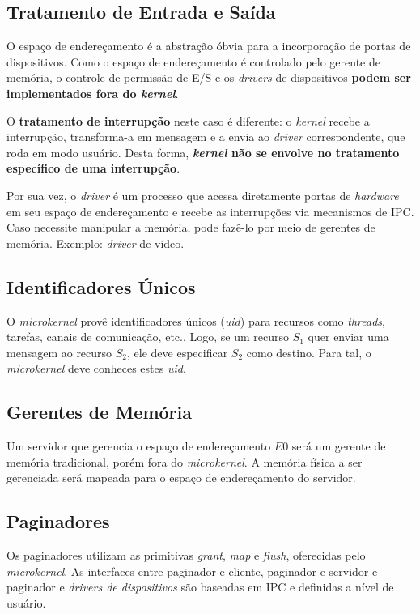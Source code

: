 \subsection{Tratamento de Entrada e Saída}
O espaço de endereçamento é a abstração óbvia para a incorporação de portas de dispositivos. Como o espaço de endereçamento é controlado pelo gerente de memória, o controle de permissão de E/S e os \textit{drivers} de dispositivos \textbf{podem ser implementados fora do \textit{kernel}}.

O \textbf{tratamento de interrupção} neste caso é diferente: o \textit{kernel} recebe a interrupção, transforma-a em mensagem e a envia ao \textit{driver} correspondente, que roda em modo usuário. Desta forma, \textbf{\textit{kernel} não se envolve no tratamento específico de uma interrupção}.

Por sua vez, o \textit{driver} é um processo que acessa diretamente portas de \textit{hardware} em seu espaço de endereçamento e recebe as interrupções via mecanismos de IPC. Caso necessite manipular a memória, pode fazê-lo por meio de gerentes de memória. \underline{Exemplo:} \textit{driver} de vídeo.

\subsection{Identificadores Únicos}
O \textit{microkernel} provê identificadores únicos (\textit{uid}) para recursos como \textit{threads}, tarefas, canais de comunicação, etc.. Logo, se um recurso $S_1$ quer enviar uma mensagem ao recurso $S_2$, ele deve especificar $S_2$ como destino. Para tal, o \textit{microkernel} deve conheces estes \textit{uid}.

\subsection{Gerentes de Memória}
Um servidor que gerencia o espaço de endereçamento $E0$ será um gerente de memória tradicional, porém fora do \textit{microkernel}. A memória física a ser gerenciada será mapeada para o espaço de endereçamento do servidor.

\subsection{Paginadores}
Os paginadores utilizam as primitivas \textit{grant}, \textit{map} e \textit{flush}, oferecidas pelo \textit{microkernel}. As interfaces entre paginador e cliente, paginador e servidor e paginador e \textit{drivers de dispositivos} são baseadas em IPC e definidas a nível de usuário.









